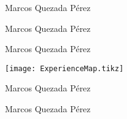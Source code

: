 \documentclass[letterpaper,landscape,MMMyyyy,nonstopmode]{resumecv}
\newcommand{\CVAuthor}{Marcos Quezada Pérez}
\newcommand{\CVWebpage}{http://www.example.com/~johndoe}
\begin{document}

\begin{minipage}{0.25\textwidth}
    \begin{minipage}[t][0.25\textheight][c]{\textwidth\UseTitleFont}
        \CVAuthor
    \end{minipage}
    \begin{minipage}[t][0.20\textheight][c]{\textwidth\UseTitleFont}
        \CVAuthor
    \end{minipage}
    \begin{minipage}[t][0.54\textheight][c]{\textwidth\UseTitleFont}
        \CVAuthor
    \end{minipage}
\end{minipage}
\begin{minipage}{0.75\textwidth}
    \begin{minipage}[t][0.45\textheight][c]{\textwidth\UseSubSectionFont}
        \texttt{[image: ExperienceMap.tikz]}
    \end{minipage}
    \begin{minipage}[t][0.20\textheight][c]{\textwidth\UseTitleFont}
        \CVAuthor
    \end{minipage}
    \begin{minipage}[t][0.34\textheight][c]{\textwidth\UseTitleFont}
        \CVAuthor
    \end{minipage}
\end{minipage}

\end{document}
